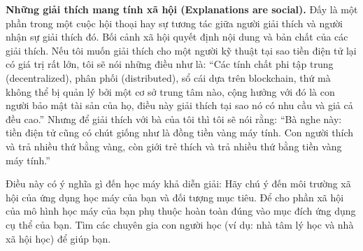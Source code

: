 \textbf{Những giải thích mang tính xã hội (Explanations are social).} Đấy là một phần trong một cuộc hội thoại hay sự tương tác giữa người giải thích và người nhận sự giải thích đó. Bối cảnh xã hội quyết định nội dung và bản chất của các giải thích. Nếu tôi muốn giải thích cho một người kỹ thuật tại sao tiền điện tử lại có giá trị rất lớn, tôi sẽ nói những điều như là: “Các tính chất phi tập trung (decentralized), phân phối (distributed), sổ cái dựa trên blockchain, thứ mà không thể bị quản lý bởi một cơ sở trung tâm nào, cộng hưởng với đó là con người bảo mật tài sản của họ, điều này giải thích tại sao nó có nhu cầu và giả cả đều cao.” Nhưng để giải thích với bà của tôi thì tôi sẽ nói rằng: “Bà nghe này: tiền điện tử cũng có chút giống như là đồng tiền vàng máy tính. Con người thích và trả nhiều thứ bằng vàng, còn giới trẻ thích và trả nhiều thứ bằng tiền vàng máy tính.”

Điều này có ý nghĩa gì đến học máy khả diễn giải: Hãy chú ý đến môi trường xã hội của ứng dụng học máy của bạn và đối tượng mục tiêu. Để cho phần xã hội của mô hình học máy của bạn phụ thuộc hoàn toàn đúng vào mục đích ứng dụng cụ thể của bạn. Tìm các chuyên gia con người học (ví dụ: nhà tâm lý học và nhà xã hội học) để giúp bạn.

